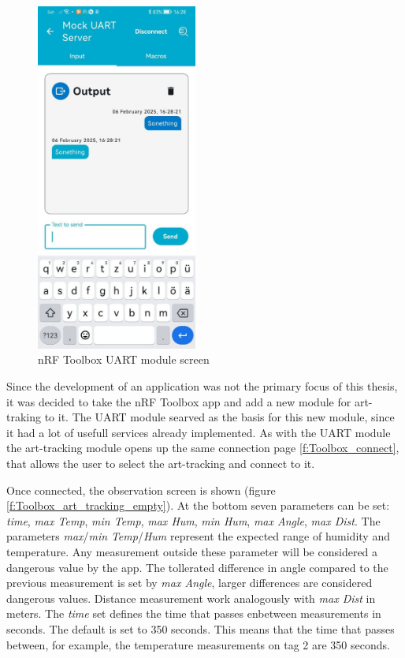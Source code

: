 \begin{figure}[ht!]
\centering
\includegraphics[width=200px]{graphics/nRF_toolbox_messanger.jpg}
\caption{nRF Toolbox UART module screen}
\label{f:Toolbox_output}
\end{figure}

Since the development of an application was not the primary focus of this thesis, it was decided to take the nRF Toolbox app and add a new module for art-traking to it.
The UART module searved as the basis for this new module, since it had a lot of usefull services already implemented.
As with the UART module the art-tracking module opens up the same connection page \ref{f:Toolbox_connect}, that allows the user to select the art-tracking and connect to it.

Once connected, the observation screen is shown (figure \ref{f:Toolbox_art_tracking_empty}).
At the bottom seven parameters can be set: \textit{time}, \textit{max Temp}, \textit{min Temp}, \textit{max Hum}, \textit{min Hum}, \textit{max Angle}, \textit{max Dist}.
The parameters \textit{max}/\textit{min} \textit{Temp}/\textit{Hum} represent the expected range of humidity and temperature.
Any measurement outside these parameter will be considered a dangerous value by the app.
The tollerated difference in angle compared to the previous measurement is set by \textit{max Angle}, larger differences are considered dangerous values.
Distance measurement work analogously with \textit{max Dist} in meters.
The \textit{time} set defines the time that passes enbetween measurements in seconds.
The default is set to 350 seconds.
This means that the time that passes between, for example, the temperature measurements on tag 2 are 350 seconds.


